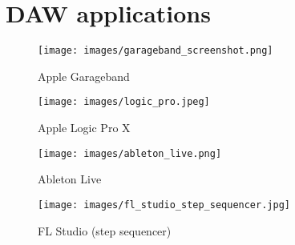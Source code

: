
\chapter{DAW applications}
\label{ch:daw-apps}

\begin{landscape}
  \begin{figure}[htb]
    \centerline{\texttt{[image: images/garageband\_screenshot.png]}}
    \caption[Apple Garageband]{Apple Garageband}
    \label{fig:garageband-screenshot}
  \end{figure}
\end{landscape}

\begin{landscape}
  \begin{figure}[htb]
    \centerline{\texttt{[image: images/logic\_pro.jpeg]}}
    \caption[Apple Logic Pro X -
    \protect{}
    \protect{}]{Apple Logic Pro X}
    \label{fig:logic-screenshot}
  \end{figure}
\end{landscape}


\begin{landscape}
  \begin{figure}[htb]
    \centerline{\texttt{[image: images/ableton\_live.png]}}
    \caption[Ableton Live -
    \protect{}
    \protect{}]{Ableton Live}
    \label{fig:ableton-screenshot}
  \end{figure}
\end{landscape}


\begin{figure}[htb]
  \centerline{\texttt{[image: images/fl\_studio\_step\_sequencer.jpg]}}

  \caption[FL Studio (step sequencer) -
  \protect{}
  \protect{}]{FL Studio (step sequencer)}
  \label{fig:flstudio-screenshot}
\end{figure}


